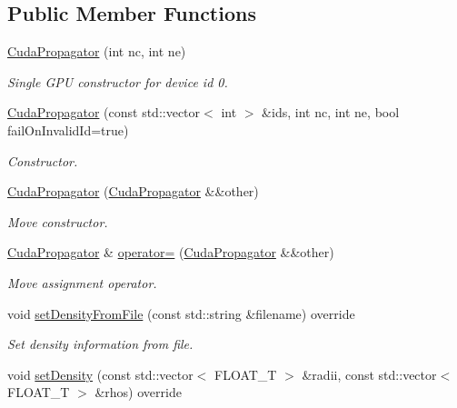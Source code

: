 \subsection*{Public Member Functions}
\begin{DoxyCompactItemize}
\item 
\hyperlink{classcudaprob3_1_1CudaPropagator_a9c7a73139fc4c8170357cca34c63137c}{Cuda\+Propagator} (int nc, int ne)
\begin{DoxyCompactList}\small\item\em Single G\+PU constructor for device id 0. \end{DoxyCompactList}\item 
\hyperlink{classcudaprob3_1_1CudaPropagator_abd40857d62f2b71e1926913d155382d9}{Cuda\+Propagator} (const std\+::vector$<$ int $>$ \&ids, int nc, int ne, bool fail\+On\+Invalid\+Id=true)
\begin{DoxyCompactList}\small\item\em Constructor. \end{DoxyCompactList}\item 
\hyperlink{classcudaprob3_1_1CudaPropagator_a900f5cc60675c9aeee91297bc8794095}{Cuda\+Propagator} (\hyperlink{classcudaprob3_1_1CudaPropagator}{Cuda\+Propagator} \&\&other)
\begin{DoxyCompactList}\small\item\em Move constructor. \end{DoxyCompactList}\item 
\hyperlink{classcudaprob3_1_1CudaPropagator}{Cuda\+Propagator} \& \hyperlink{classcudaprob3_1_1CudaPropagator_aa49d62a4d79bac574a53e291b084089a}{operator=} (\hyperlink{classcudaprob3_1_1CudaPropagator}{Cuda\+Propagator} \&\&other)
\begin{DoxyCompactList}\small\item\em Move assignment operator. \end{DoxyCompactList}\item 
void \hyperlink{classcudaprob3_1_1CudaPropagator_a61124bdc43a631b55ad1e9bd36a872eb}{set\+Density\+From\+File} (const std\+::string \&filename) override
\begin{DoxyCompactList}\small\item\em Set density information from file. \end{DoxyCompactList}\item 
void \hyperlink{classcudaprob3_1_1CudaPropagator_a90deddfaf8ab3c830a60d5ad5fbcfb43}{set\+Density} (const std\+::vector$<$ F\+L\+O\+A\+T\+\_\+T $>$ \&radii, const std\+::vector$<$ F\+L\+O\+A\+T\+\_\+T $>$ \&rhos) override

\end{DoxyCompactItemize}
